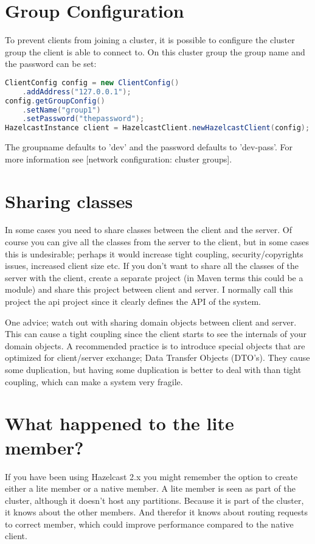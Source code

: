 \section{Group Configuration}
To prevent clients from joining a cluster, it is possible to configure the cluster group the client is able to connect to. On this cluster group the group name and the password can be set:
\begin{lstlisting}[language=java]
ClientConfig config = new ClientConfig()
    .addAddress("127.0.0.1");
config.getGroupConfig()
    .setName("group1")
    .setPassword("thepassword");
HazelcastInstance client = HazelcastClient.newHazelcastClient(config);
\end{lstlisting}
The groupname defaults to 'dev' and the password defaults to 'dev-pass'. For more information see [network configuration: cluster groups].

\section{Sharing classes}
In some cases you need to share classes between the client and the server. Of course you can give all the classes from the server to the client, but in some cases this is undesirable; perhaps it would increase tight coupling, security/copyrights issues, increased client size etc. If you don't want to share all the classes of the server with the client, create a separate project (in Maven terms this could be a module) and share this project between client and server. I normally call this project the api project since it clearly defines the API of the system. 

One advice; watch out with sharing domain objects between client and server. This can cause a tight coupling since the client starts to see the internals of your domain objects. A recommended practice is to introduce special objects that are optimized for client/server exchange; Data Transfer Objects (DTO's). They cause some duplication, but having some duplication is better to deal with than tight coupling, which can make a system very fragile.

\section{What happened to the lite member?}
If you have been using Hazelcast 2.x you might remember the option to create either a lite member or a native member. A lite member is seen as part of the cluster, although it doesn't host any partitions. Because it is part of the cluster, it knows about the other members. And therefor it knows about routing requests to correct member, which could improve performance compared to the native client. 

